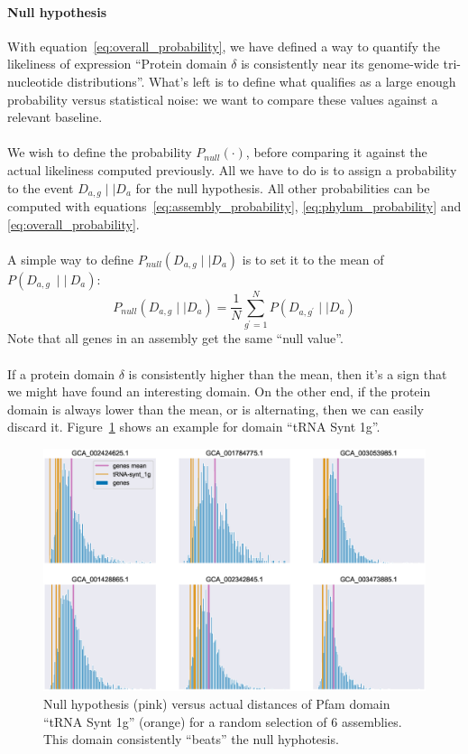 \documentclass[12pt]{article}
\begin{document}
\paragraph{Null hypothesis}
With equation~\ref{eq:overall_probability}, we have defined a way to quantify the likeliness of expression ``Protein domain $\delta$ is consistently near its genome-wide tri-nucleotide distributions''. What's left is to define what qualifies as a large enough probability versus statistical noise: we want to compare these values against a relevant baseline.\\
\\
We wish to define the probability $P_{null}(\cdot)$, before comparing it against the actual likeliness computed previously. All we have to do is to assign a probability to the event $D_{a,g} \mid\mid D_a$ for the null hypothesis. All other probabilities can be computed with equations~\ref{eq:assembly_probability}, \ref{eq:phylum_probability} and \ref{eq:overall_probability}.\\
\\
A simple way to define $P_{null}(D_{a,g} \mid\mid D_a)$ is to set it to the mean of $P(D_{a,g}~\mid\mid~D_a)$:
%
\begin{equation}
P_{null}(D_{a,g} \mid\mid D_a) = \frac{1}{N}\sum\limits_{g^{\prime}=1}^{N} P(D_{a,g^{\prime}} \mid\mid D_a)
\end{equation}
%
Note that all genes in an assembly get the same ``null value''.\\
\\
If a protein domain $\delta$ is consistently higher than the mean, then it's a sign that we might have found an interesting domain. On the other end, if the protein domain is always lower than the mean, or is alternating, then we can easily discard it. Figure~\ref{fig:trna_synt_1g_dist} shows an example for domain ``tRNA Synt 1g''.

\pagebreak

\begin{figure}[!htb]
\hspace*{-1.2cm}
\includegraphics[scale = .5]{trna_synt_1g_dist.eps}
\caption{Null hypothesis (pink) versus actual distances of Pfam domain ``tRNA Synt 1g'' (orange) for a random selection of 6 assemblies. This domain consistently ``beats'' the null hyphotesis.}
\label{fig:trna_synt_1g_dist}
\end{figure}
\end{document}

